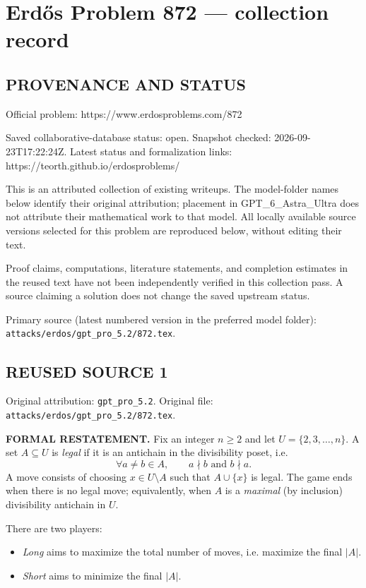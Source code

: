 \section*{Erd\H{o}s Problem 872 --- collection record}

\subsection*{PROVENANCE AND STATUS}
Official problem: https://www.erdosproblems.com/872

Saved collaborative-database status: open.
Snapshot checked: 2026-09-23T17:22:24Z.
Latest status and formalization links: https://teorth.github.io/erdosproblems/

This is an attributed collection of existing writeups. The model-folder names below identify their original attribution; placement in GPT\_6\_Astra\_Ultra does not attribute their mathematical work to that model. All locally available source versions selected for this problem are reproduced below, without editing their text.

Proof claims, computations, literature statements, and completion estimates in the reused text have not been independently verified in this collection pass. A source claiming a solution does not change the saved upstream status.

Primary source (latest numbered version in the preferred model folder): \texttt{attacks/erdos/gpt\_pro\_5.2/872.tex}.

\subsection*{REUSED SOURCE 1}
Original attribution: \texttt{gpt\_pro\_5.2}.
Original file: \texttt{attacks/erdos/gpt\_pro\_5.2/872.tex}.


\noindent\textbf{FORMAL RESTATEMENT.}
Fix an integer $n\ge 2$ and let $U=\{2,3,\dots,n\}$.
A set $A\subseteq U$ is \emph{legal} if it is an antichain in the divisibility poset, i.e.
\[
\forall a\neq b\in A,\qquad a\nmid b\text{ and }b\nmid a.
\]
A move consists of choosing $x\in U\setminus A$ such that $A\cup\{x\}$ is legal.
The game ends when there is no legal move; equivalently, when $A$ is a \emph{maximal} (by inclusion) divisibility antichain in $U$.

There are two players:
\begin{itemize}
\item \emph{Long} aims to maximize the total number of moves, i.e. maximize the final $|A|$.
\item \emph{Short} aims to minimize the final $|A|$.
\end{itemize}

